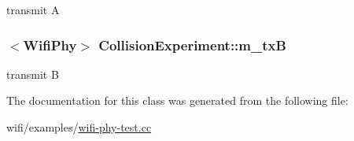 transmit A 

\subsubsection[{\texorpdfstring{m\+\_\+txB}{m_txB}}]{$<${\bf Wifi\+Phy}$>$ Collision\+Experiment\+::m\+\_\+txB\hspace{0.3cm}{\ttfamily [private]}}\hypertarget{classCollisionExperiment_aa84222ca77a56ddb4cc28475f64a57b0}{}\label{classCollisionExperiment_aa84222ca77a56ddb4cc28475f64a57b0}


transmit B 



The documentation for this class was generated from the following file\+:\begin{DoxyCompactItemize}
\item 
wifi/examples/\hyperlink{wifi-phy-test_8cc}{wifi-\/phy-\/test.\+cc}\end{DoxyCompactItemize}
